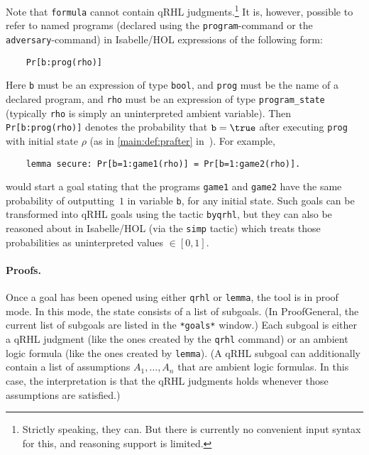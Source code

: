 \documentclass{article}
\newcommand\qrhlautoref[1]{\autoref*{main:#1} in~\cite{qrhl-paper-from-manual}}
\begin{document}
Note that \texttt{formula} cannot contain qRHL judgments.\footnote{Strictly speaking, they can. But there is currently no convenient input syntax for this, and reasoning support is limited.}
It is, however, possible to refer to
named programs (declared using the \texttt{program}-command or the
\texttt{adversary}-command) in Isabelle/HOL expressions of the
following form:
\begin{center}
  \begin{lstlisting}
    Pr[b:prog(rho)]
  \end{lstlisting}
\end{center}
Here \texttt{b} must be an expression of type \texttt{bool},
and \texttt{prog} must be the name of a
declared program, and \texttt{rho} must be an expression of type
\texttt{program\_state} (typically \texttt{rho} is simply an
uninterpreted ambient variable).  Then \texttt{Pr[b:prog(rho)]} 
denotes the probability that $\mathtt{b}=\true$
after executing \texttt{prog} with initial state $\rho$
(as in \qrhlautoref{def:prafter}).  For example,
\begin{center}
  \begin{lstlisting}
    lemma secure: Pr[b=1:game1(rho)] = Pr[b=1:game2(rho)].
  \end{lstlisting}
\end{center}
would start a goal stating that the programs \texttt{game1} and
\texttt{game2} have the same probability of outputting~$1$
in variable \texttt{b}, for any initial state. Such goals can be
transformed into qRHL goals using the tactic \texttt{byqrhl}, but they
can also be reasoned about in Isabelle/HOL (via the \texttt{simp}
tactic) which treats those probabilities as uninterpreted values $\in[0,1]$.


\paragraph{Proofs.} Once a goal has been opened using either
\texttt{qrhl} or \texttt{lemma}, the tool is in proof mode. In this
mode, the state consists of a list of subgoals. (In ProofGeneral, the
current list of subgoals are listed in the \texttt{*goals*} window.)
Each subgoal is either a qRHL judgment (like the ones created by the
\texttt{qrhl} command) or an ambient logic formula (like the ones
created by \texttt{lemma}). (A qRHL subgoal can additionally contain a
list of assumptions $A_1,\dots,A_n$
that are ambient logic formulas. In this case, the interpretation is
that the qRHL judgments holds whenever those assumptions are satisfied.)
\end{document}
